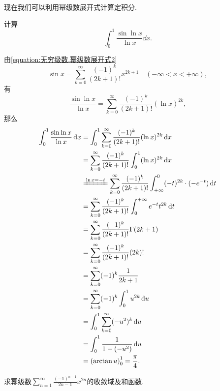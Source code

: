现在我们可以利用幂级数展开式计算定积分.
\begin{example}
计算\begin{equation*}
	\int_0^1 \frac{\sin\ln x}{\ln x} \dd{x}.
\end{equation*}
\begin{solution}
由\cref{equation:无穷级数.幂级数展开式2} \begin{equation*}
	\sin x = \sum_{k=0}^\infty \frac{(-1)^k}{(2k+1)!} x^{2k+1}
	\quad(-\infty<x<+\infty),
\end{equation*}
有\begin{equation*}
	\frac{\sin\ln x}{\ln x} = \sum_{k=0}^\infty \frac{(-1)^k}{(2k+1)!} (\ln x)^{2k},
\end{equation*}
那么\begin{align*}
	\int_0^1 \frac{\sin\ln x}{\ln x} \dd{x}
	&= \int_0^1 \sum_{k=0}^\infty \frac{(-1)^k}{(2k+1)!} (\ln x)^{2k} \dd{x} \\
	&= \sum_{k=0}^\infty \frac{(-1)^k}{(2k+1)!} \int_0^1 (\ln x)^{2k} \dd{x} \\
	&\xlongequal{\ln x = -t}
		\sum_{k=0}^\infty \frac{(-1)^k}{(2k+1)!}
		\int_{+\infty}^0 (-t)^{2k} \cdot (-e^{-t}) \dd{t} \\
	&= \sum_{k=0}^\infty \frac{(-1)^k}{(2k+1)!}
		\int^{+\infty}_0 e^{-t} t^{2k} \dd{t} \\
	&= \sum_{k=0}^\infty \frac{(-1)^k}{(2k+1)!} \Gamma(2k+1) \\
	&= \sum_{k=0}^\infty \frac{(-1)^k}{(2k+1)!} (2k)! \\
	&= \sum_{k=0}^\infty (-1)^k \frac{1}{2k+1} \\
	&= \sum_{k=0}^\infty (-1)^k \int_0^1 u^{2k} \dd{u} \\
	&= \int_0^1 \sum_{k=0}^\infty (-u^2)^k \dd{u} \\
	&= \int_0^1 \frac{1}{1-(-u^2)} \dd{u} \\
	&= \left(\arctan u\right)_0^1
	= \frac{\pi}{4}.
\end{align*}
\end{solution}
\end{example}

\begin{example}
求幂级数\(\sum_{n=1}^\infty \frac{(-1)^{n-1}}{2n-1} x^{2n}\)的收敛域及和函数.
\end{example}
